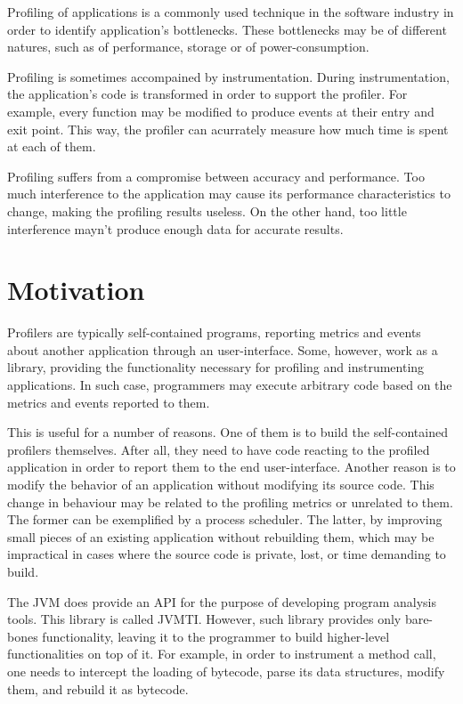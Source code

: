 
Profiling of applications is a commonly used technique in the software industry in order to identify application's bottlenecks. These bottlenecks may be of different natures, such as of performance, storage or of power-consumption.

Profiling is sometimes accompained by instrumentation. During instrumentation, the application's code is transformed in order to support the profiler. For example, every function may be modified to produce events at their entry and exit point. This way, the profiler can acurrately measure how much time is spent at each of them.

Profiling suffers from a compromise between accuracy and performance. Too much interference to the application may cause its performance characteristics to change, making the profiling results useless. On the other hand, too little interference mayn't produce enough data for accurate results.


\section{Motivation}

Profilers are typically self-contained programs, reporting metrics and events about another application through an user-interface. Some, however, work as a library, providing the functionality necessary for profiling and instrumenting applications. In such case, programmers may execute arbitrary code based on the metrics and events reported to them.

This is useful for a number of reasons. One of them is to build the self-contained profilers themselves. After all, they need to have code reacting to the profiled application in order to report them to the end user-interface. Another reason is to modify the behavior of an application without modifying its source code. This change in behaviour may be related to the profiling metrics or unrelated to them. The former can be exemplified by a process scheduler. The latter, by improving small pieces of an existing application without rebuilding them, which may be impractical in cases where the source code is private, lost, or time demanding to build.

The JVM does provide an API for the purpose of developing program analysis tools. This library is called JVMTI. However, such library provides only bare-bones functionality, leaving it to the programmer to build higher-level functionalities on top of it. For example, in order to instrument a method call, one needs to intercept the loading of bytecode, parse its data structures, modify them, and rebuild it as bytecode.

